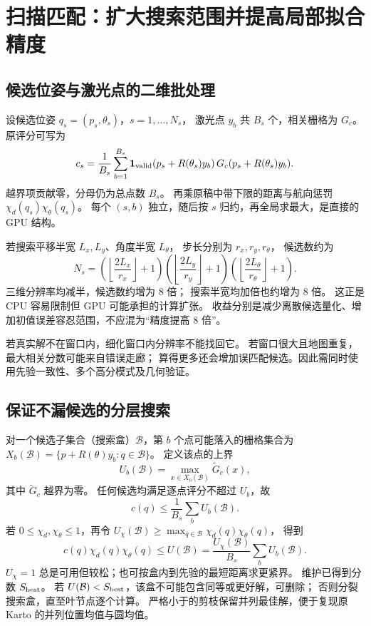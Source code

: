 \section{扫描匹配：扩大搜索范围并提高局部拟合精度}
\subsection{候选位姿与激光点的二维批处理}
设候选位姿 $q_s=(p_s,\theta_s)$，$s=1,\dots,N_s$，
激光点 $y_b$ 共 $B_s$ 个，相关栅格为 $G_c$。
原评分可写为
\begin{equation}
c_s=\frac1{B_s}\sum_{b=1}^{B_s}
\mathbf1_{\rm valid}(p_s+R(\theta_s)y_b)\,
G_c(p_s+R(\theta_s)y_b).
\end{equation}
越界项贡献零，分母仍为总点数 $B_s$。
再乘原稿中带下限的距离与航向惩罚 $\chi_d(q_s)\chi_\theta(q_s)$。
每个 $(s,b)$ 独立，随后按 $s$ 归约，再全局求最大，是直接的 GPU 结构。

若搜索平移半宽 $L_x,L_y$、角度半宽 $L_\theta$，
步长分别为 $r_x,r_y,r_\theta$，
候选数约为
\[
N_s=
\left(\left\lfloor\frac{2L_x}{r_x}\right\rfloor+1\right)
\left(\left\lfloor\frac{2L_y}{r_y}\right\rfloor+1\right)
\left(\left\lfloor\frac{2L_\theta}{r_\theta}\right\rfloor+1\right).
\]
三维分辨率均减半，候选数约增为 8 倍；
搜索半宽均加倍也约增为 8 倍。
这正是 CPU 容易限制但 GPU 可能承担的计算扩张。
收益分别是减少离散候选量化、增加初值误差容忍范围，不应混为“精度提高 8 倍”。

若真实解不在窗口内，细化窗口内分辨率不能找回它。
若窗口很大且地图重复，最大相关分数可能来自错误走廊；
算得更多还会增加误匹配候选。因此需同时使用先验一致性、多个高分模式及几何验证。

\subsection{保证不漏候选的分层搜索}
对一个候选子集合（搜索盒）$\mathcal B$，第 $b$ 个点可能落入的栅格集合为
$X_b(\mathcal B)=\{p+R(\theta)y_b:q\in\mathcal B\}$。
定义该点的上界
\[
U_b(\mathcal B)=\max_{x\in X_b(\mathcal B)}\widetilde G_c(x),
\]
其中 $\widetilde G_c$ 越界为零。
任何候选均满足逐点评分不超过 $U_b$，故
\[
c(q)\le\frac1{B_s}\sum_b U_b(\mathcal B).
\]
若 $0\le\chi_d,\chi_\theta\le1$，再令
$U_\chi(\mathcal B)\ge\max_{q\in\mathcal B}\chi_d(q)\chi_\theta(q)$，
得到
\begin{equation}
c(q)\chi_d(q)\chi_\theta(q)
\le U(\mathcal B)
=\frac{U_\chi(\mathcal B)}{B_s}\sum_bU_b(\mathcal B).
\label{eq:bnb}
\end{equation}
$U_\chi=1$ 总是可用但较松；也可按盒内到先验的最短距离求更紧界。
维护已得到分数 $S_{\rm best}$。
若 $U(\mathcal B)<S_{\rm best}$，该盒不可能包含同等或更好解，可删除；
否则分裂搜索盒，直至叶节点逐个计算。
严格小于的剪枝保留并列最佳解，便于复现原 Karto 的并列位置均值与圆均值。


